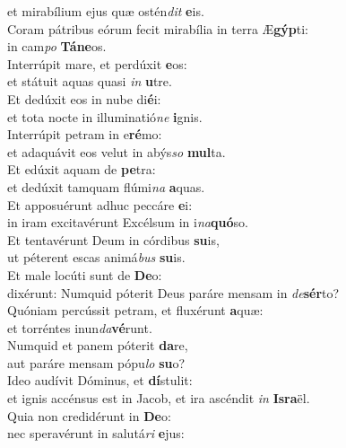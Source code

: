 \evenverse et mirabílium ejus quæ ostén\textit{dit} \textbf{e}is.\\
\oddverse Coram pátribus eórum fecit mirabília in terra Æ\textbf{gýp}ti:~\*\\
\oddverse in cam\textit{po} \textbf{Tá}\textbf{ne}os.\\
\evenverse Interrúpit mare, et perdúxit \textbf{e}os:~\*\\
\evenverse et státuit aquas quasi \textit{in} \textbf{u}tre.\\
\oddverse Et dedúxit eos in nube di\textbf{é}i:~\*\\
\oddverse et tota nocte in illuminatió\textit{ne} \textbf{i}gnis.\\
\evenverse Interrúpit petram in e\textbf{ré}mo:~\*\\
\evenverse et adaquávit eos velut in abýs\textit{so} \textbf{mul}ta.\\
\oddverse Et edúxit aquam de \textbf{pe}tra:~\*\\
\oddverse et dedúxit tamquam flúmi\textit{na} \textbf{a}quas.\\
\evenverse Et apposuérunt adhuc peccáre \textbf{e}i:~\*\\
\evenverse in iram excitavérunt Excélsum in i\textit{na}\textbf{quó}so.\\
\oddverse Et tentavérunt Deum in córdibus \textbf{su}is,~\*\\
\oddverse ut péterent escas animá\textit{bus} \textbf{su}is.\\
\evenverse Et male locúti sunt de \textbf{De}o:~\*\\
\evenverse dixérunt: Numquid póterit Deus paráre mensam in \textit{de}\textbf{sér}to?\\
\oddverse Quóniam percússit petram, et fluxérunt \textbf{a}quæ:~\*\\
\oddverse et torréntes inun\textit{da}\textbf{vé}runt.\\
\evenverse Numquid et panem póterit \textbf{da}re,~\*\\
\evenverse aut paráre mensam pópu\textit{lo} \textbf{su}o?\\
\oddverse Ideo audívit Dóminus, et \textbf{dí}stulit:~\*\\
\oddverse et ignis accénsus est in Jacob, et ira ascéndit \textit{in} \textbf{Is}\textbf{ra}ël.\\
\evenverse Quia non credidérunt in \textbf{De}o:~\*\\
\evenverse nec speravérunt in salutá\textit{ri} \textbf{e}jus:\\
